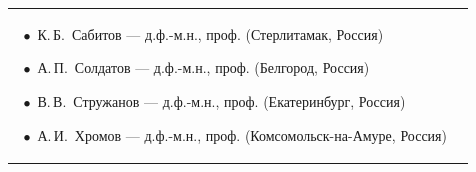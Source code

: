 \begin{table}[t!]
\begin{tabular}{p{7cm}p{6cm}}
{$~~\bullet$ К.\,Б.~Сабитов --- д.ф.-м.н., проф. (Стерлитамак, Россия)\par 
$~~\bullet$ А.\,П.~Солдатов --- д.ф.-м.н., проф. (Белгород, Россия) \par
$~~\bullet$ В.\,В.~Стружанов --- д.ф.-м.н., проф. (Екатеринбург, Россия) \par 
$~~\bullet$ А.\,И.~Хромов --- д.ф.-м.н., проф. (Комсомольск-на-Амуре, Россия)\par
\smallskip \par
}  \\
\end{tabular}
\end{table}

\clearpage
\thispagestyle{empty}


